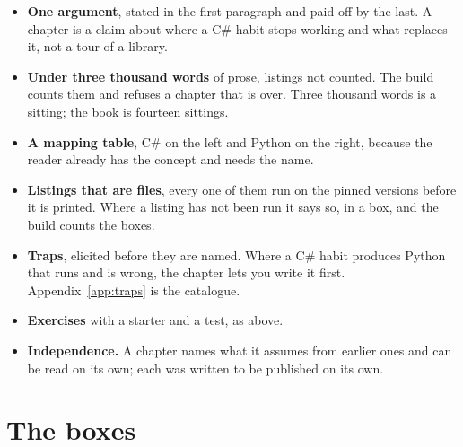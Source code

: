 \begin{itemize}[leftmargin=1.4em, itemsep=2pt]
  \item \textbf{One argument}, stated in the first paragraph and paid off by
        the last. A chapter is a claim about where a C\# habit stops working
        and what replaces it, not a tour of a library.
  \item \textbf{Under three thousand words} of prose, listings not counted.
        The build counts them and refuses a chapter that is over. Three
        thousand words is a sitting; the book is fourteen sittings.
  \item \textbf{A mapping table}, C\# on the left and Python on the right,
        because the reader already has the concept and needs the name.
  \item \textbf{Listings that are files}, every one of them run on the pinned
        versions before it is printed. Where a listing has not been run it
        says so, in a box, and the build counts the boxes.
  \item \textbf{Traps}, elicited before they are named. Where a C\# habit
        produces Python that runs and is wrong, the chapter lets you write it
        first. Appendix~\ref{app:traps} is the catalogue.
  \item \textbf{Exercises} with a starter and a test, as above.
  \item \textbf{Independence.} A chapter names what it assumes from earlier
        ones and can be read on its own; each was written to be published on
        its own.
\end{itemize}

\section*{The boxes}


